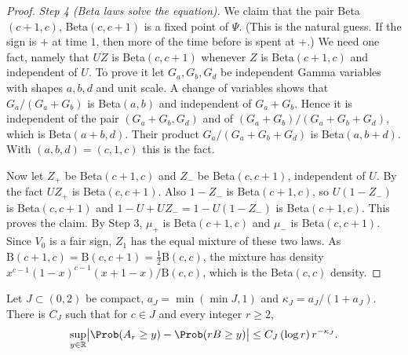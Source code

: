 \begin{proof}
\emph{Step 4 (Beta laws solve the equation).} We claim that the pair
Beta$(c+1,c)$, Beta$(c,c+1)$ is a fixed point of $\Psi$. (This is the natural
guess. If the sign is $+$ at time $1$, then more of the time before is spent
at $+$.) We need one fact, namely that $UZ$ is Beta$(c,c+1)$ whenever $Z$ is
Beta$(c+1,c)$ and independent of $U$. To prove it let $G_a,G_b,G_d$ be
independent Gamma variables with shapes $a,b,d$ and unit scale. A change of
variables shows that $G_a/(G_a+G_b)$ is Beta$(a,b)$ and independent of
$G_a+G_b$. Hence it is independent of the pair $(G_a+G_b,G_d)$ and of
$(G_a+G_b)/(G_a+G_b+G_d)$, which is Beta$(a+b,d)$. Their product
$G_a/(G_a+G_b+G_d)$ is Beta$(a,b+d)$. With $(a,b,d)=(c,1,c)$ this is the
fact.

Now let $Z_+$ be Beta$(c+1,c)$ and $Z_-$ be Beta$(c,c+1)$, independent of
$U$. By the fact $UZ_+$ is Beta$(c,c+1)$. Also $1-Z_-$ is Beta$(c+1,c)$, so
$U(1-Z_-)$ is Beta$(c,c+1)$ and $1-U+UZ_-=1-U(1-Z_-)$ is Beta$(c+1,c)$. This
proves the claim. By Step 3, $\mu_+$ is Beta$(c+1,c)$ and $\mu_-$ is
Beta$(c,c+1)$. Since $V_0$ is a fair sign, $Z_1$ has the equal mixture of
these two laws. As $\mathrm B(c+1,c)=\mathrm B(c,c+1)=\frac12\mathrm B(c,c)$,
the mixture has density $x^{c-1}(1-x)^{c-1}(x+1-x)/\mathrm B(c,c)$, which is
the Beta$(c,c)$ density.
\end{proof}

\begin{lemma}[coupling]\label{lem:D-coupling}
Let $J\subset(0,2)$ be compact, $a_J=\min(\min J,1)$ and
$\kappa_J=a_J/(1+a_J)$. There is $C_J$ such that for $c\in J$ and every
integer $r\ge2$,
\[
\sup_{y\in\mathbb R}\bigl\lvert\Prob(A_r\ge y)-\Prob(rB\ge y)\bigr\rvert
\le C_J\,(\log r)\,r^{-\kappa_J}.
\]
\end{lemma}

